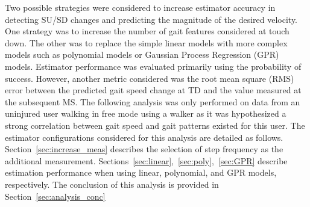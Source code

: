 Two possible strategies were considered to increase estimator accuracy in detecting SU/SD changes and predicting the magnitude of the desired velocity. One strategy was to increase the number of gait features considered at touch down. The other was to replace the simple linear models with more complex models such as polynomial models or Gaussian Process Regression (GPR) models. Estimator performance was evaluated primarily using the probability of success. However, another metric considered was the root mean square (RMS) error between the predicted gait speed change at TD and the value measured at the subsequent MS. The following analysis was only performed on data from an uninjured user walking in free mode using a walker as it was hypothesized a strong correlation between gait speed and gait patterns existed for this user. The estimator configurations considered for this analysis are detailed as follows. Section~\ref{sec:increase_meas} describes the selection of step frequency as the additional measurement. Sections~\ref{sec:linear},~\ref{sec:poly},~\ref{sec:GPR} describe estimation performance when using linear, polynomial, and GPR models, respectively. The conclusion of this analysis is provided in Section~\ref{sec:analysis_conc}
%
%

